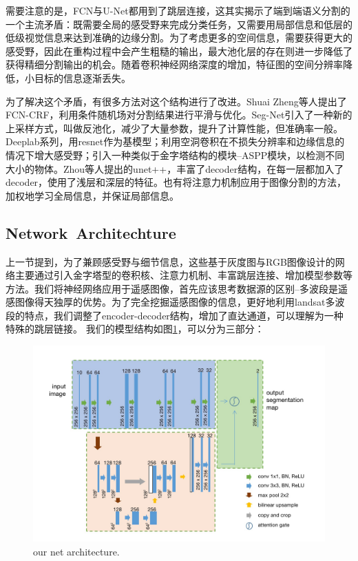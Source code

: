 \documentclass[UTF8]{ctexart}
\begin{document}
需要注意的是，FCN与U-Net都用到了跳层连接，这其实揭示了端到端语义分割的一个主流矛盾：既需要全局的感受野来完成分类任务，又需要用局部信息和低层的低级视觉信息来达到准确的边缘分割。为了考虑更多的空间信息，需要获得更大的感受野，因此在重构过程中会产生粗糙的输出，最大池化层的存在则进一步降低了获得精细分割输出的机会。随着卷积神经网络深度的增加，特征图的空间分辨率降低，小目标的信息逐渐丢失。

为了解决这个矛盾，有很多方法对这个结构进行了改进。Shuai Zheng等人\cite{zheng2015conditional}提出了FCN-CRF，利用条件随机场对分割结果进行平滑与优化。Seg-Net\cite{badrinarayanan2015segnet}引入了一种新的上采样方式，叫做反池化，减少了大量参数，提升了计算性能，但准确率一般。Deeplab\cite{chen2014semantic, chen2017deeplab, chen2017rethinking}系列，用resnet作为基模型；利用空洞卷积在不损失分辨率和边缘信息的情况下增大感受野；引入一种类似于金字塔结构的模块--ASPP模块，以检测不同大小的物体。Zhou等人\cite{zhou2018unet++}提出的unet++，丰富了decoder结构，在每一层都加入了decoder，使用了浅层和深层的特征。也有将注意力机制应用于图像分割的方法\cite{zhang2018context, li2018pyramid, oktay2018attention}，加权地学习全局信息，并保证局部信息。

\subsection{Network Architechture}

上一节提到，为了兼顾感受野与细节信息，这些基于灰度图与RGB图像设计的网络主要通过引入金字塔型的卷积核、注意力机制、丰富跳层连接、增加模型参数等方法。我们将神经网络应用于遥感图像，首先应该思考数据源的区别--多波段是遥感图像得天独厚的优势。为了完全挖掘遥感图像的信息，更好地利用landsat多波段的特点，我们调整了encoder-decoder结构，增加了直达通道，可以理解为一种特殊的跳层链接。
我们的模型结构如图\ref{fig_myModel}，可以分为三部分：
\begin{figure}[H]
    \centering
    \includegraphics[scale=0.25]{../pic/model.jpg}
    \caption{our net architecture.}
    \label{fig_myModel}
\end{figure}
\end{document}
